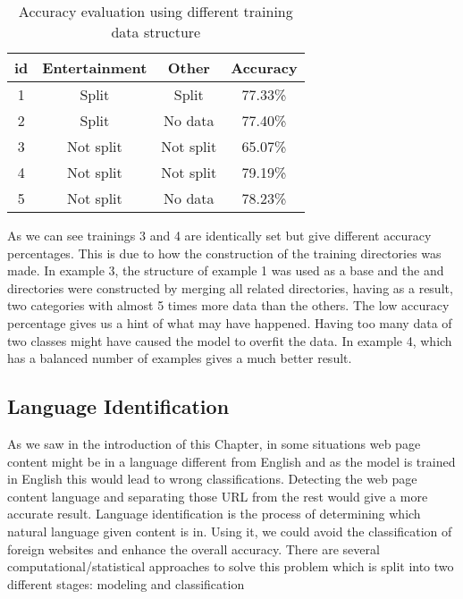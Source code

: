 \begin{table}[htbp]
\caption{Accuracy evaluation using different training data structure}
\begin{center}
\begin{tabular}{|c|c|c|c|}
\hline
\textbf{id} & \textbf{Entertainment} & \textbf{Other} & \textbf{Accuracy} \\ \hline
1 & Split & Split & 77.33\% \\ \hline
2 & Split & No data & 77.40\% \\ \hline
3 & Not split & Not split & 65.07\% \\ \hline
4 & Not split & Not split & 79.19\% \\ \hline
5 & Not split & No data & 78.23\% \\ \hline
\end{tabular}
\end{center}
\label{tab:accuracy}
\end{table}

As we can see trainings 3 and 4 are identically set but give different accuracy percentages. This is due to how the construction of the training directories was made. In example 3, the structure
of example 1 was used as a base and the  and  directories were constructed by merging all related directories, having as a result, two categories with almost 5 times more data
than the others. The low accuracy percentage gives us a hint of what may have happened. Having too many data of two classes might have caused the model to overfit the data. In example 4, which has
a balanced number of examples gives a much better result. 

\clearpage
{}


\subsection{Language Identification}
As we saw in the introduction of this Chapter, in some situations web page content might be in a language different from English and as the model is trained in English this would lead to wrong 
classifications. Detecting the web page content language and separating those URL from the rest would give a more accurate result.
Language identification is the process of determining which natural language given content is in. Using it, we could avoid the classification of foreign websites and enhance the overall accuracy.
There are several computational/statistical approaches to solve this problem which is split into two different stages: modeling and classification

